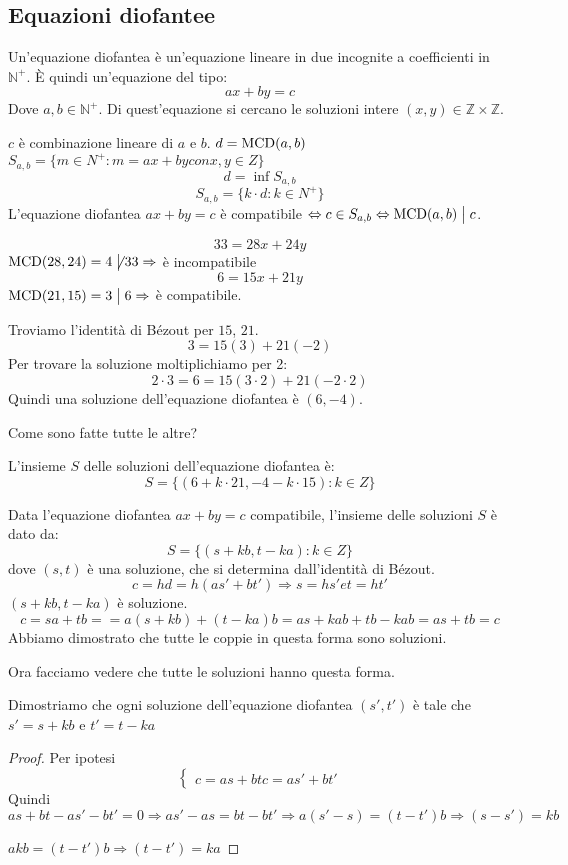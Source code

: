 \subsection{Equazioni diofantee}

\begin{defn}
Un'equazione diofantea \`e un'equazione lineare in due incognite a coefficienti in $\mathbb{N}^+$. \`E quindi un'equazione del tipo:
\[
a x + b y = c
\]
Dove $a, b \in \mathbb{N}^+$. Di quest'equazione si cercano le soluzioni intere $(x, y) \in \mathbb{Z} \times \mathbb{Z}$.
\end{defn}
$c$ \`e combinazione lineare di $a$ e $b$. $d = \operatorname{MCD}(a,b)$ $S_{a,b} = \{ m \in N^+ : m = a x + b y con x, y \in Z\}$
\[
d = \inf S_{a,b}
\]
\[
S_{a,b} = \{ k \cdot d : k \in N^+ \}
\]
L'equazione diofantea $a x + by = c$ \`e compatibile $\Leftrightarrow c \in S_{a,b} \Leftrightarrow \operatorname{MCD}(a,b) \bigm| c$.

\begin{exmp}
\[
33 = 28 x + 24 y
\]
$\operatorname{MCD}(28, 24) = 4 \not\bigm| 33 \Rightarrow$ \`e incompatibile
\[
6 = 15 x + 21 y
\]
$\operatorname{MCD}(21, 15) = 3 \bigm| 6 \Rightarrow$ \`e compatibile.

Troviamo l'identit\`a di B\'ezout per $15$, $21$.
\[
3 = 15 (3) + 21 (-2)
\]
Per trovare la soluzione moltiplichiamo per 2:
\[
2 \cdot 3 = 6 = 15 (3 \cdot 2) + 21 (-2 \cdot 2)
\]
Quindi una soluzione dell'equazione diofantea \`e $(6, -4)$.

Come sono fatte tutte le altre?

L'insieme $S$ delle soluzioni dell'equazione diofantea \`e:
\[
S = \{ (6 + k \cdot 21, - 4 - k \cdot 15) : k \in Z \}
\]
\end{exmp}

Data l'equazione diofantea $a x + b y = c$ compatibile, l'insieme delle soluzioni $S$ \`e dato da:
\[
S = \{ (s + k b, t - k a) : k \in Z \}
\]
dove $(s, t)$ \`e una soluzione, che si determina dall'identit\`a di B\'ezout.
\[
c = h d = h (a s' + b t') \Rightarrow s = h s' e t = h t'
\]
$(s + kb, t - ka)$ \`e soluzione.
\[
c = s a + t b = = a ( s + k b) + (t - k a) b = 
a s + k a b + t b - k a b = a s + t b = c
\]
Abbiamo dimostrato che tutte le coppie in questa forma sono soluzioni.

Ora facciamo vedere che tutte le soluzioni hanno questa forma.

Dimostriamo che ogni soluzione dell'equazione diofantea $(s', t')$ \`e tale che $s' = s + k b$ e $t' = t - k a $

\begin{proof}
Per ipotesi 
\[
\begin{cases}
c = a s + b t
c = a s' + b t'
\end{cases}
\]
Quindi $a s + b t - a s' - b t' = 0 \Rightarrow
a s' - a s = b t - b t' \Rightarrow
a (s' - s) = (t - t') b \Rightarrow
(s - s') = k b$

$a k b = (t - t') b \Rightarrow (t - t') = k a$
\end{proof}

